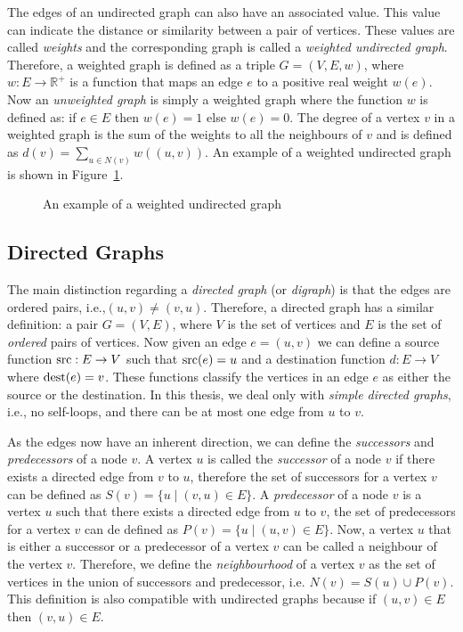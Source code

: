 The edges of an undirected graph can also have an associated value.
This value can indicate the distance or similarity between a pair of vertices.
These values are called \textit{weights} and the corresponding graph is called a \textit{weighted undirected graph}.
Therefore, a weighted graph is defined as a triple $G=(V,E,w)$, where $w:E \rightarrow \mathbb{R}^{+}$ is a function that maps an edge $e$ to a positive real weight $w(e)$.
Now an \textit{unweighted graph} is simply a weighted graph where the function $w$ is defined as: if $e \in E$ then $w(e)=1$ else $w(e)=0$.
The degree of a vertex $v$ in a weighted graph is the sum of the weights to all the neighbours of $v$ and is defined as $d(v) = \sum_{u\in N(v)}w((u,v))$.
An example of a weighted undirected graph is shown in Figure~\ref{fig:weighted-undirected}. 
\begin{figure}[!ht]
    \centering
    
    \caption{An example of a weighted undirected graph}
    \label{fig:weighted-undirected}
\end{figure}


\subsection{Directed Graphs}
The main distinction regarding a \textit{directed graph} (or \textit{digraph}) is that the edges are ordered pairs, i.e.,$(u,v) \neq (v,u)$.
Therefore, a directed graph has a similar definition: a pair $G=(V,E)$, where $V$ is the set of vertices and $E$ is the set of \textit{ordered} pairs of vertices.
Now given an edge $e=(u,v)$ we can define a source function $\operatorname*{src}:E\rightarrow V$ such that $\operatorname*{src}(e)=u$ and a destination function $d:E\rightarrow V$ where $\operatorname*{dest}(e)=v$.
These functions classify the vertices in an edge $e$ as either the source or the destination.
In this thesis, we deal only with \textit{simple directed graphs}, i.e., no self-loops, and there can be at most one edge from $u$ to $v$. 

As the edges now have an inherent direction, we can define the \textit{successors} and \textit{predecessors} of a node $v$.
A vertex $u$ is called the \textit{successor} of a node $v$ if there exists a directed edge from $v$ to $u$, therefore the set of successors for a vertex $v$ can be defined as $S(v) = \{u \mid (v,u) \in E\}$.
A \textit{predecessor} of a node $v$ is a vertex $u$ such that there exists a directed edge from $u$ to $v$, the set of predecessors for a vertex $v$ can de defined as $P(v) = \{u \mid (u,v) \in E\}$.
Now, a vertex $u$ that is either a successor or a predecessor of a vertex $v$ can be called a neighbour of the vertex $v$.
Therefore, we define the \textit{neighbourhood} of a vertex $v$ as the set of vertices in the union of successors and predecessor, i.e. $N(v) = S(u) \cup P(v)$.
This definition is also compatible with undirected graphs because if $(u,v) \in E$ then $(v,u) \in E$. 

